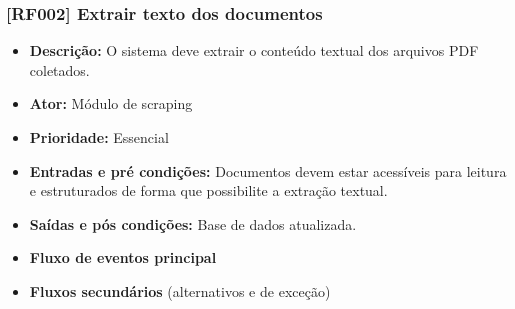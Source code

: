 \subsubsection{[RF002] Extrair texto dos documentos}
\begin{itemize}
   \item \textbf{Descrição:} O sistema deve extrair o conteúdo textual dos arquivos PDF coletados.
   \item \textbf{Ator:} Módulo de scraping
   \item \textbf{Prioridade:} Essencial
   \item \textbf{Entradas e pré condições:} Documentos devem estar acessíveis para leitura e estruturados de forma que possibilite a extração textual.
   \item \textbf{Saídas e pós condições:} Base de dados atualizada.
   \item \textbf{Fluxo de eventos principal}
   \item \textbf{Fluxos secundários} (alternativos e de exceção)
 \end{itemize}
 
